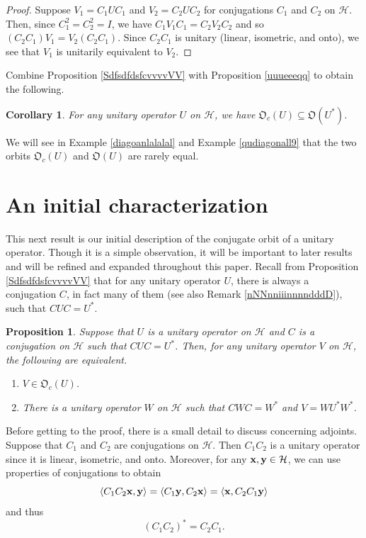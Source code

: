 \documentclass{dis}
\theoremstyle{plain}
\newtheorem{Proposition}[equation]{Proposition}
\newtheorem{Corollary}[equation]{Corollary}
\theoremstyle{definition}
\renewcommand{\subset}{\subseteq}
\renewcommand{\vec}[1]{{\bf #1}}
\newcommand{\0}{{\color{lightgray}0}}
\begin{document}
\begin{proof}
Suppose $V_1 = C_1 U C_1$ and $V_2 = C_2 U C_2$ for conjugations $C_1$ and $C_2$ on $\mathcal{H}$. Then, since $C_{1}^{2} = C_{2}^{2} = I$, we have
$C_1 V_1 C_1 = C_2 V_2 C_2$ and so $(C_2 C_1) V_1 = V_2 (C_2 C_1)$. Since $C_2 C_1$ is unitary (linear, isometric, and onto), we see that $V_1$ is unitarily equivalent to $V_2$.
\end{proof}

Combine Proposition \ref{SdfsdfdsfcvvvvVV} with Proposition \ref{uuueeeqq} to obtain the following. 

\begin{Corollary}\label{Sdfsdfdsf11112}
For any unitary  operator $U$ on $\mathcal{H}$, we have $\mathfrak{O}_c(U) \subset \mathfrak{O}(U^{*})$. 
\end{Corollary}


 We will  see in Example \ref{diagoanlalalal} and Example \ref{qudiagonall9} that the two orbits $\mathfrak{O}_c(U)$ and $\mathfrak{O}(U)$ are rarely equal. 

\section{An initial characterization}

This next result  is our initial description of the conjugate orbit of a unitary operator. Though it is a simple observation, it will be  important to later results and  will be refined and expanded throughout this paper. Recall from  Proposition \ref{SdfsdfdsfcvvvvVV} that for any unitary operator  $U$, there is always a conjugation $C$, in fact many of them  \cite{MR4747045} (see also Remark \ref{nNNnniiinnnndddD}), such that $C U C = U^{*}$.

\begin{Proposition}\label{sdfhjsd9f9ds9dsf9sdf9s9df}
Suppose that $U$ is a unitary operator on $\mathcal{H}$ and $C$ is a conjugation on $\mathcal{H}$ such that $C U C = U^{*}$. Then, for any unitary operator $V$ on $\mathcal{H}$, the following are equivalent.
\begin{enumerate}
\item $V \in \mathfrak{O}_c(U)$.
\item There is a unitary operator  $W$ on $\mathcal{H}$ such that $C W C = W^{*}$ and $V = W U^{*} W^{*}$.
\end{enumerate}
\end{Proposition}

Before getting to the proof, there is a small detail to discuss concerning adjoints. Suppose that $C_1$ and $C_2$ are conjugations on $\mathcal{H}$. Then $C_1 C_2$ is a unitary operator since it is linear, isometric, and onto. Moreover, for any $\vec{x}, \vec{y} \in \mathcal{H}$, we can use  properties of conjugations to obtain 
$$
\langle C_1 C_2 \vec{x}, \vec{y}\rangle  = \langle C_1 \vec{y}, C_2 \vec{x}\rangle = \langle \vec{x}, C_2 C_1 \vec{y}\rangle
$$
and thus
\begin{equation}\label{sdfkjgfkgdsfvkjkjknknk}
(C_1 C_2)^{*} = C_2 C_1.
\end{equation}
\end{document}

